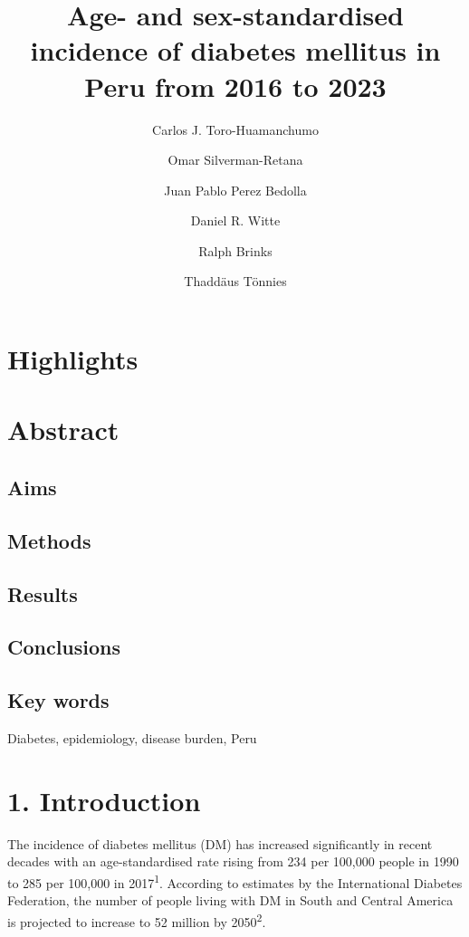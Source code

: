 \documentclass[
  letterpaper,
  DIV=11,
  numbers=noendperiod]{scrartcl}
\title{Age- and sex-standardised incidence of diabetes mellitus in Peru
from 2016 to 2023}
\author{Carlos J. Toro-Huamanchumo \and Omar Silverman-Retana \and Juan
Pablo Perez Bedolla \and Daniel R. Witte \and Ralph Brinks \and Thaddäus
Tönnies}
\date{}
\begin{document}
\maketitle


\newpage{}

\section{Highlights}\label{highlights}

\newpage{}

\section{Abstract}\label{abstract}

\subsection{Aims}\label{aims}

\subsection{Methods}\label{methods}

\subsection{Results}\label{results}

\subsection{Conclusions}\label{conclusions}

\subsection{Key words}\label{key-words}

Diabetes, epidemiology, disease burden, Peru

\newpage{}

\section{1. Introduction}\label{introduction}

The incidence of diabetes mellitus (DM) has increased significantly in
recent decades with an age-standardised rate rising from 234 per 100,000
people in 1990 to 285 per 100,000 in 2017\textsuperscript{1}. According
to estimates by the International Diabetes Federation, the number of
people living with DM in South and Central America is projected to
increase to 52 million by 2050\textsuperscript{2}.
\end{document}
